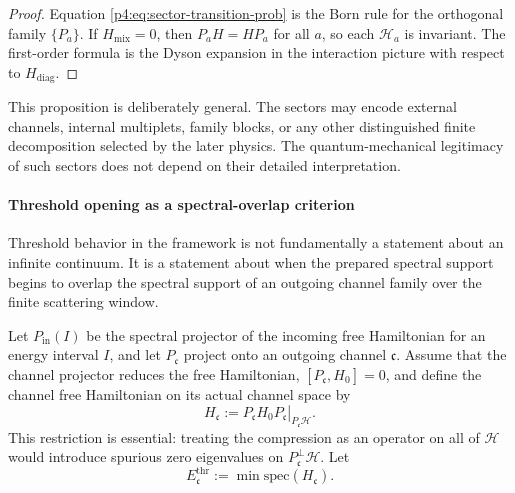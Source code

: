 \documentclass[12pt,a4paper]{article}
\begin{document}
\begin{proof}
Equation \eqref{p4:eq:sector-transition-prob} is the Born rule for the orthogonal family
\(\{P_a\}\).
If \(H_{\mathrm{mix}}=0\), then \(P_aH=HP_a\) for all \(a\), so each \(\mathcal H_a\) is invariant.
The first-order formula is the Dyson expansion in the interaction picture with
respect to \(H_{\mathrm{diag}}\).
\end{proof}

\begin{remark}
\label{p4:rem:sector-transition-meaning}
This proposition is deliberately general.
The sectors may encode external channels, internal multiplets, family blocks,
or any other distinguished finite decomposition selected by the later physics.
The quantum-mechanical legitimacy of such sectors does not depend on their detailed interpretation.
\end{remark}



\paragraph{Threshold opening as a spectral-overlap criterion}
\label{p4:sec:part2-threshold-opening}

Threshold behavior in the framework is not fundamentally a statement about an infinite continuum.
It is a statement about when the prepared spectral support begins to overlap the
spectral support of an outgoing channel family over the finite scattering window.

Let \(P_{\mathrm{in}}(I)\) be the spectral projector of the incoming free
Hamiltonian for an energy interval \(I\), and let \(P_{\mathfrak c}\) project
onto an outgoing channel \(\mathfrak c\).  Assume that the channel projector
reduces the free Hamiltonian,
\([P_{\mathfrak c},H_0]=0\), and define the channel free Hamiltonian on its
actual channel space by
\[
H_{\mathfrak c}
:=
\left.
P_{\mathfrak c}H_0P_{\mathfrak c}
\right|_{P_{\mathfrak c}\mathcal H}.
\]
This restriction is essential: treating the compression as an operator on
all of \(\mathcal H\) would introduce spurious zero eigenvalues on
\(P_{\mathfrak c}^{\perp}\mathcal H\).  Let
\begin{equation}
\label{p4:eq:channel-threshold}
E_{\mathfrak c}^{\mathrm{thr}}
:=\min\mathrm{spec}(H_{\mathfrak c}).
\end{equation}
\end{document}
